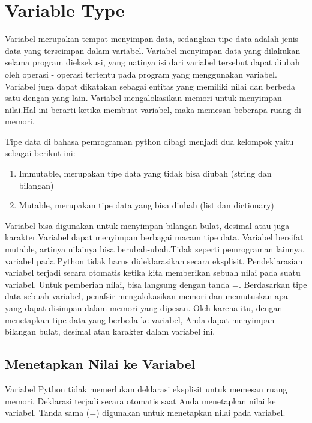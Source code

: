 
\section{Variable Type}
Variabel merupakan tempat menyimpan data, sedangkan tipe data adalah jenis data yang terseimpan dalam variabel. Variabel menyimpan data yang dilakukan selama program dieksekusi, yang natinya isi dari variabel tersebut dapat diubah oleh operasi - operasi tertentu pada program yang menggunakan variabel. Variabel juga dapat dikatakan sebagai entitas yang memiliki nilai dan berbeda satu dengan yang lain. Variabel mengalokasikan memori untuk menyimpan nilai.Hal ini berarti ketika membuat variabel, maka  memesan beberapa ruang di memori. 

Tipe data di bahasa pemrograman python dibagi menjadi dua kelompok yaitu sebagai berikut ini:
\begin{enumerate}
	\item Immutable, merupakan tipe data yang tidak bisa diubah (string dan bilangan)
	\item Mutable, merupakan tipe data yang bisa diubah (list dan dictionary)
\end{enumerate}  

Variabel bisa digunakan untuk menyimpan bilangan bulat, desimal atau juga karakter.Variabel dapat menyimpan berbagai macam tipe data. Variabel bersifat mutable, artinya nilainya bisa berubah-ubah.Tidak seperti pemrograman lainnya, variabel pada Python tidak harus dideklarasikan secara eksplisit. Pendeklarasian variabel terjadi secara otomatis ketika kita memberikan sebuah nilai pada suatu variabel. Untuk pemberian nilai, bisa langsung dengan tanda =. Berdasarkan tipe data sebuah variabel, penafsir mengalokasikan memori dan memutuskan apa yang dapat disimpan dalam memori yang dipesan. Oleh karena itu, dengan menetapkan tipe data yang berbeda ke variabel, Anda dapat menyimpan bilangan bulat, desimal atau karakter dalam variabel ini.

\subsection{Menetapkan Nilai ke Variabel}
Variabel Python tidak memerlukan deklarasi eksplisit untuk memesan ruang memori. Deklarasi terjadi secara otomatis saat Anda menetapkan nilai ke variabel. Tanda sama (=) digunakan untuk menetapkan nilai pada variabel.

